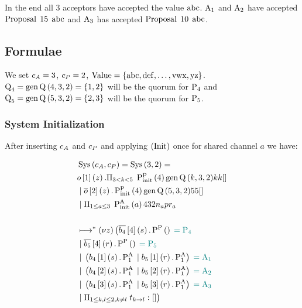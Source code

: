 In the end all $3$ acceptors have accepted the value $\operatorname{abc}$.
$\operatorname{A_{1}}$ and $\operatorname{A_{2}}$ have accepted $\operatorname{Proposal}\; 15\; \operatorname{abc}$ and $\operatorname{A_{3}}$ has accepted $\operatorname{Proposal}\; 10\; \operatorname{abc}$.

\subsection{Formulae}
We set $c_A = 3$, $c_P = 2$,
$\operatorname{Value}=\left\{\operatorname{abc}, \operatorname{def}, \dots, \operatorname{vwx}, \operatorname{yz}\right\}$.
$\operatorname{Q}_4 = \operatorname{gen\operatorname{Q}}\left(4, 3, 2\right) = \left\{1,2\right\}$ will be the quorum for $\operatorname{P_{4}}$ and $\operatorname{Q}_5 = \operatorname{gen\operatorname{Q}}\left(5, 3, 2\right) = \left\{2,3\right\}$ will be the quorum for $\operatorname{P_{5}}$.

\subsubsection{System Initialization}
After inserting $c_A$ and $c_P$ and applying $\left(\operatorname{Init}\right)$ once for shared channel $a$ we have:

\begin{align*}
&\operatorname{Sys}\left(c_A, c_P\right) = \operatorname{Sys}\left(3, 2\right) =\\
&o\left[1\right]\left(z\right).\Pi_{3 < k < 5}\; \textstyle\operatorname{P^{P}_{init}}\left(4\right){\operatorname{gen\operatorname{Q}}\left(k, 3, 2\right)}{k}{k}{\mathtt{[]}}\\
&\; | \; \overline{o}\left[2\right]\left(z\right).\textstyle\operatorname{P^{P}_{init}}\left(4\right){\operatorname{gen\operatorname{Q}}\left(5, 3, 2\right)}{5}{5}{\mathtt{[]}}\\
&\; | \; \Pi_{1 \le a \le 3}\; \operatorname{P^{A}_{init}}\left(a\right){4}{3}{2}{n_{a}}{pr_{a}}
\\\\
&\longmapsto^* \left(\nu z\right)\big (
\overline{b_{4}}\left[4\right]\left(s\right).\operatorname{P^{P}_{}}\left(\right) \;\textcolor{teal}{= \operatorname{P_{4}}}\\
&\; | \; \overline{b_{5}}\left[4\right]\left(r\right).\operatorname{P^{P}_{}}\left(\right) \;\textcolor{teal}{= \operatorname{P_{5}}}\\
&\; | \; \left(b_{4}\left[1\right]\left(s\right).\operatorname{P^{A}_{1}} \; | \; b_{5}\left[1\right]\left(r\right).\operatorname{P^{A}_{1}}\right) \;\textcolor{teal}{= \operatorname{A_{1}}}\\
&\; | \; \left(b_{4}\left[2\right]\left(s\right).\operatorname{P^{A}_{1}} \; | \; b_{5}\left[2\right]\left(r\right).\operatorname{P^{A}_{1}}\right) \;\textcolor{teal}{= \operatorname{A_{2}}}\\
&\; | \; \left(b_{4}\left[3\right]\left(s\right).\operatorname{P^{A}_{1}} \; | \; b_{5}\left[3\right]\left(r\right).\operatorname{P^{A}_{1}}\right) \;\textcolor{teal}{= \operatorname{A_{3}}}\\
&\; | \; \Pi_{1 \le k,l \le 2, k \neq l}\; t_{k\to l}:[]
\big )
\end{align*}

